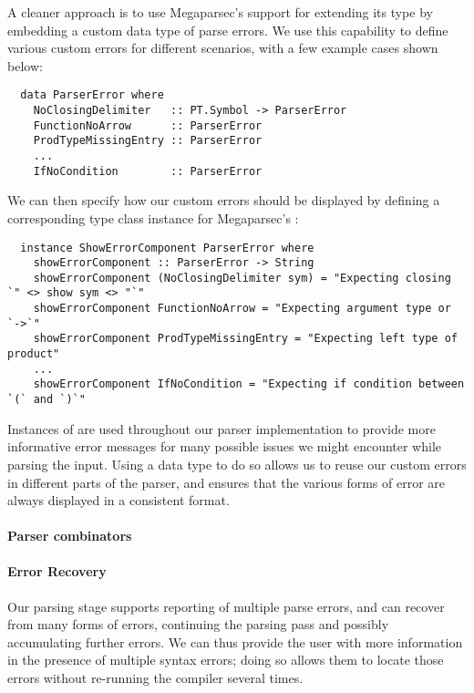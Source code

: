 A cleaner approach is to use Megaparsec's support for extending its
 type by embedding a custom data type of parse errors.
We use this capability to define various custom errors for different scenarios,
with a few example cases shown below:
%
\begin{verbatim}
  data ParserError where
    NoClosingDelimiter   :: PT.Symbol -> ParserError
    FunctionNoArrow      :: ParserError
    ProdTypeMissingEntry :: ParserError
    ...
    IfNoCondition        :: ParserError
\end{verbatim}

We can then specify how our custom errors should be displayed by defining a
corresponding type class instance for Megaparsec's :
%
\begin{verbatim}
  instance ShowErrorComponent ParserError where
    showErrorComponent :: ParserError -> String
    showErrorComponent (NoClosingDelimiter sym) = "Expecting closing `" <> show sym <> "`"
    showErrorComponent FunctionNoArrow = "Expecting argument type or `->`"
    showErrorComponent ProdTypeMissingEntry = "Expecting left type of product"
    ...
    showErrorComponent IfNoCondition = "Expecting if condition between `(` and `)`"
\end{verbatim}

Instances of  are used throughout our parser implementation
to provide more informative error messages for many possible issues we might
encounter while parsing the input.
Using a data type to do so allows us to reuse our custom errors in different
parts of the parser, and ensures that the various forms of error are always
displayed in a consistent format.


\paragraph{Parser combinators}


\paragraph{Error Recovery}

Our parsing stage supports reporting of multiple parse errors, and can recover
from many forms of errors, continuing the parsing pass and possibly accumulating
further errors.
We can thus provide the user with more information in the presence of multiple
syntax errors; doing so allows them to locate those errors without re-running
the compiler several times.

